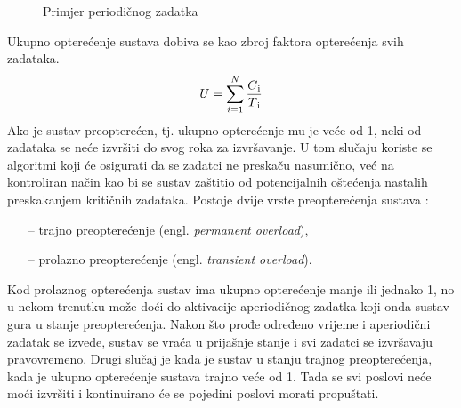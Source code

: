 \documentclass[../zavrsni.tex]{subfiles}
\begin{document}
  \begin{figure}[!htb]
    \label{fig:periodic} 
    \caption{Primjer periodičnog zadatka}
  \end{figure}

Ukupno opterećenje sustava dobiva se kao zbroj faktora opterećenja svih zadataka. 
\begin{equation*}
    U = \sum_{i=1}^{N}\frac{C\textsubscript{i}}{T\textsubscript{i}}
\end{equation*}
Ako je sustav preopterećen, tj. ukupno opterećenje mu 
je veće od 1, neki od zadataka se neće izvršiti do svog roka za izvršavanje. U tom slučaju koriste se algoritmi koji će osigurati 
da se zadatci ne preskaču nasumično, već na kontroliran način kao bi se sustav zaštitio od potencijalnih oštećenja nastalih preskakanjem 
kritičnih zadataka. Postoje dvije vrste preopterećenja sustava \cite{clanak_3}:
\begin{itemize}
    \item[--] trajno preopterećenje (engl. \textit{permanent overload}),
    \item[--] prolazno preopterećenje (engl. \textit{transient overload}).
\end{itemize}
Kod prolaznog opterećenja sustav ima ukupno opterećenje manje ili jednako 1, no u nekom trenutku može doći do aktivacije aperiodičnog zadatka 
koji onda sustav gura u stanje preopterećenja. Nakon što prođe određeno vrijeme i aperiodični zadatak se izvede, sustav se vraća u prijašnje
stanje i svi zadatci se izvršavaju pravovremeno. Drugi slučaj je kada je sustav u stanju trajnog preopterećenja, kada je ukupno 
opterećenje sustava trajno veće od 1. Tada se svi poslovi neće moći izvršiti i kontinuirano će se pojedini poslovi morati propuštati. 
\end{document}
